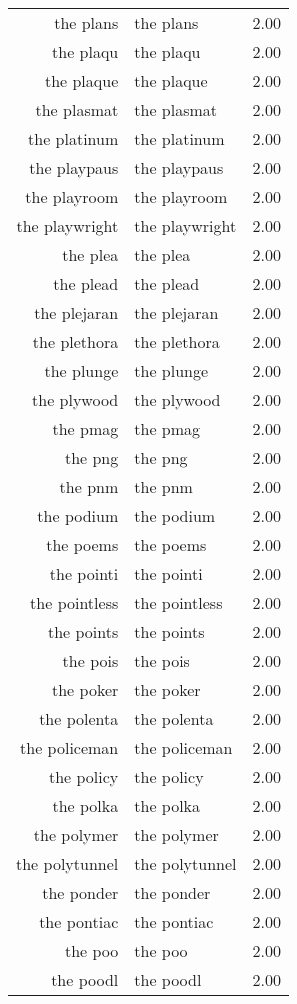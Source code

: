 \begin{table}[ht]
\begin{tabular}{rlr}
  the plans & the plans & 2.00 \\ 
  the plaqu & the plaqu & 2.00 \\ 
  the plaque & the plaque & 2.00 \\ 
  the plasmat & the plasmat & 2.00 \\ 
  the platinum & the platinum & 2.00 \\ 
  the playpaus & the playpaus & 2.00 \\ 
  the playroom & the playroom & 2.00 \\ 
  the playwright & the playwright & 2.00 \\ 
  the plea & the plea & 2.00 \\ 
  the plead & the plead & 2.00 \\ 
  the plejaran & the plejaran & 2.00 \\ 
  the plethora & the plethora & 2.00 \\ 
  the plunge & the plunge & 2.00 \\ 
  the plywood & the plywood & 2.00 \\ 
  the pmag & the pmag & 2.00 \\ 
  the png & the png & 2.00 \\ 
  the pnm & the pnm & 2.00 \\ 
  the podium & the podium & 2.00 \\ 
  the poems & the poems & 2.00 \\ 
  the pointi & the pointi & 2.00 \\ 
  the pointless & the pointless & 2.00 \\ 
  the points & the points & 2.00 \\ 
  the pois & the pois & 2.00 \\ 
  the poker & the poker & 2.00 \\ 
  the polenta & the polenta & 2.00 \\ 
  the policeman & the policeman & 2.00 \\ 
  the policy & the policy & 2.00 \\ 
  the polka & the polka & 2.00 \\ 
  the polymer & the polymer & 2.00 \\ 
  the polytunnel & the polytunnel & 2.00 \\ 
  the ponder & the ponder & 2.00 \\ 
  the pontiac & the pontiac & 2.00 \\ 
  the poo & the poo & 2.00 \\ 
  the poodl & the poodl & 2.00 \\ 

\end{tabular}
\end{table}
